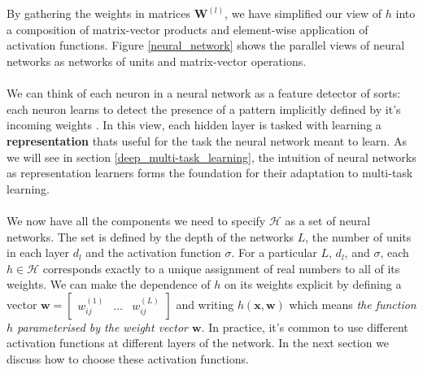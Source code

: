 \\\\
By gathering the weights in matrices $\mathbf{W}^{(l)}$, we have simplified our view of $h$ into a composition of matrix-vector products and element-wise application of activation functions. Figure \ref{neural_network} shows the parallel views of neural networks as networks of units and matrix-vector operations.
\\\\
We can think of each neuron in a neural network as a feature detector of sorts: each neuron learns to detect the presence of a pattern implicitly defined by it's incoming weights \citep{goodfellow16}. In this view, each hidden layer is tasked with learning a \textbf{representation} thats useful for the task the neural network meant to learn. As we will see in section \ref{deep_multi-task_learning}, the intuition of neural networks as representation learners forms the foundation for their adaptation to multi-task learning.
\\\\
We now have all the components we need to specify $\mathcal{H}$ as a set of neural networks. The set is defined by the depth of the networks $L$, the number of units in each layer $d_l$ and the activation function $\sigma$.
For a particular $L$, $d_l$, and $\sigma$, each $h \in \mathcal{H}$ corresponds exactly to a unique assignment of real numbers to all of its weights. We can make the dependence of $h$ on its weights explicit by defining a vector $\mathbf{w} = \begin{bmatrix} w^{(1)}_{ij} & \dots & w^{(L)}_{ij}\end{bmatrix}$ and writing $h(\mathbf{x}, \mathbf{w})$ which means \textit{the function $h$ parameterised by the weight vector $\mathbf{w}$}. In practice, it's common to use different activation functions at different layers of the network. In the next section we discuss how to choose these activation functions.

